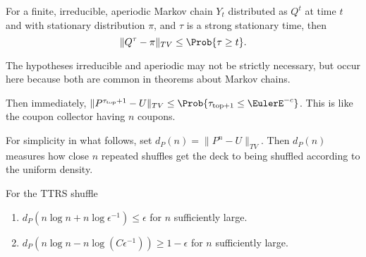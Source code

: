 \documentclass[12pt]{article}
\begin{document}
\begin{theorem}
    For a finite, irreducible, aperiodic Markov chain \( Y_t \)
    distributed as \( Q^t \) at time \( t \) and with stationary
    distribution \( \pi \), and \( \tau \) is a strong stationary time,
    then
    \[
        \| Q^{\tau} - \pi \|_{TV} \le \Prob{\tau \ge t}.
    \]
\end{theorem}

\begin{remark}
    The hypotheses irreducible and aperiodic may not be strictly
    necessary, but occur here because both are common in theorems about
    Markov chains.
\end{remark}

Then immediately, \( \| P^{\tau_{\text{top}}+1} - U \|_{TV} \le \Prob{\tau_
{\text{top}+1} \le \EulerE^{-c}} \).  This is like the coupon collector
having \( n \) coupons.

For simplicity in what follows, set \( d_P(n) = \| P^n - U \|_{TV} \).
Then \( d_P(n) \) measures how close \( n \) repeated shuffles get the
deck to being shuffled according to the uniform density.

\begin{theorem}
    For the TTRS shuffle
    \begin{enumerate}
        \item
            \( d_P(n \log n + n \log \epsilon^{-1} )\le \epsilon \) for \(
            n \) sufficiently large.
        \item
            \( d_P(n \log n - n \log (C \epsilon^{-1})) \ge 1-\epsilon \)
            for \( n \) sufficiently large.
    \end{enumerate}
\end{theorem}
\end{document}
